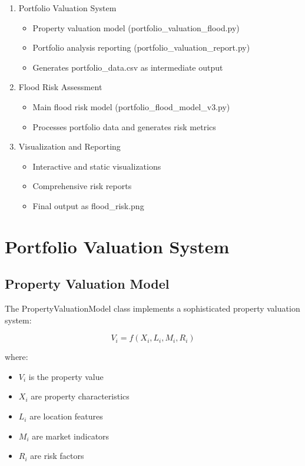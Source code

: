 \documentclass{article}
\begin{document}
\begin{enumerate}
    \item Portfolio Valuation System
    \begin{itemize}
        \item Property valuation model (portfolio\_valuation\_flood.py)
        \item Portfolio analysis reporting (portfolio\_valuation\_report.py)
        \item Generates portfolio\_data.csv as intermediate output
    \end{itemize}
    
    \item Flood Risk Assessment
    \begin{itemize}
        \item Main flood risk model (portfolio\_flood\_model\_v3.py)
        \item Processes portfolio data and generates risk metrics
    \end{itemize}
    
    \item Visualization and Reporting
    \begin{itemize}
        \item Interactive and static visualizations
        \item Comprehensive risk reports
        \item Final output as flood\_risk.png
    \end{itemize}
\end{enumerate}

\section{Portfolio Valuation System}

\subsection{Property Valuation Model}
The PropertyValuationModel class implements a sophisticated property valuation system:

\begin{equation}
V_i = f(X_i, L_i, M_i, R_i)
\end{equation}

where:
\begin{itemize}
    \item $V_i$ is the property value
    \item $X_i$ are property characteristics
    \item $L_i$ are location features
    \item $M_i$ are market indicators
    \item $R_i$ are risk factors
\end{itemize}
\end{document}
